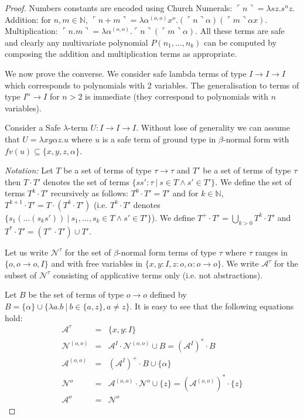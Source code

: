 \documentclass{article}
\newcommand{\encode}[1]{\ulcorner #1 \urcorner}
\newcommand{\nat}{\mathbb{N}}
\newcommand{\union}{\cup}
\newcommand{\Union}{\bigcup}
\begin{document}
\begin{proof}
Numbers constants are encoded using Church Numerals: $\encode{n} = \lambda s z. s^n z$. 
Addition: for $n,m \in \nat$, $\encode{n+m} = \lambda \alpha^{(o,o)} x^o . (\encode{n} \alpha) (\encode{m} \alpha x)$. Multiplication: $\encode{n . m} = \lambda \alpha^{(o,o)} . \encode{n} (\encode{m} \alpha)$.
All these terms are safe and clearly any multivariate polynomial $P(n_1, \ldots, n_k)$ can be computed by composing the addition and multiplication terms as appropriate.

We now prove the converse. We consider safe lambda terms of type $I\rightarrow I  \rightarrow I$ which corresponds to polynomials with 2 variables. The generalisation to terms of type $I^n \rightarrow I$ for $n>2$ is immediate (they correspond to polynomials with $n$ variables).
 
Consider a Safe $\lambda$-term $U:I\rightarrow I\rightarrow I$. Without lose of generality we can assume that $U = \lambda x y \alpha z. u$ where $u$ is a safe term of ground type in $\beta$-normal form with $fv(u) \subseteq \{ x, y, z, \alpha \}$.

\emph{Notation:} Let $T$ be a set of terms of type $\tau \rightarrow \tau$ and $T'$ be a set of terms of type $\tau$ then $T \cdot T'$ denotes the set of terms $\{ s s' : \tau \ | \ s \in T \wedge s' \in T' \}$. We define the set of terms 
$T^k \cdot T'$ recursively as follows:  $T^0 \cdot T' = T'$ and
for $k\in\nat$, $T^{k+1} \cdot T' = T \cdot (T^k \cdot T')$ (i.e. $T^k \cdot T'$ denotes $\{ s_1( \ldots (s_k s'))  \ | \ s_1, \ldots, s_k \in T \wedge s' \in T' \}$). We define $T^+\cdot T' = \Union_{k > 0} T^k \cdot T'$ and 
$T^*\cdot T' = (T^+\cdot T') \union T'$.

Let us write $\mathcal{N}^\tau$ for the set of $\beta$-normal form terms of type $\tau$ where $\tau$ ranges in $\{ o, o\rightarrow o, I  \}$ and with free variables in $\{ x,y:I, z:o, \alpha:o\rightarrow o\}$. We write $\mathcal{A}^\tau$ for the subset of $\mathcal{N}^\tau$ consisting of applicative terms only (i.e. not abstractions).

Let $B$ be the set of terms of type $o\rightarrow o$ defined by $B = \{ \alpha \} \union \{ \lambda a.b \ | \ b \in \{a,z\}, a \neq z \}$.
It is easy to see that the following equations hold:
\begin{eqnarray*}
\mathcal{A}^\tau &=& \{ x,y :I \} \\
\mathcal{N}^{(o,o)} &=& \mathcal{A}^I \cdot \mathcal{N}^{(o,o)} \union B = (\mathcal{A}^I)^* \cdot B \\
\mathcal{A}^{(o,o)} &=& (\mathcal{A}^I)^+ \cdot B \union \{ \alpha \} \\
\mathcal{N}^o &=& \mathcal{A}^{(o,o)} \cdot \mathcal{N}^o \union \{ z \} = (\mathcal{A}^{(o,o)})^* \cdot \{ z \} \\
\mathcal{A}^o &=& \mathcal{N}^{o}
\end{eqnarray*}


\end{proof}
\end{document}
